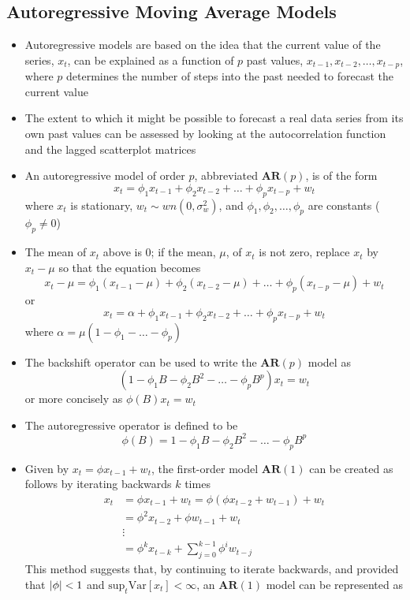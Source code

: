 \documentclass[12pt]{article}
\renewcommand{\var}[1]{\text{Var}\left[ #1 \right]}
\newcommand{\ar}[1]{$\mathbf{AR}(#1)$}
\begin{document}
\subsection{Autoregressive Moving Average Models}
\begin{itemize}
\item Autoregressive models are based on the idea that the current value of the series, $x_t$, can be explained as a function of $p$ past values, $x_{t-1}, x_{t-2},\dots,x_{t-p}$, where $p$ determines the number of steps into the past needed to forecast the current value
\item The extent to which it might be possible to forecast a real data series from its own past values can be assessed by looking at the autocorrelation function and the lagged scatterplot matrices 
\item An autoregressive model of order $p$, abbreviated \ar{p}, is of the form
$$ x_t = \phi_1x_{t-1} + \phi_2x_{t-2} + \dots + \phi_px_{t-p} + w_t $$ 
where $x_t$ is stationary, $w_t \sim wn(0, \sigma^2_w)$, and $\phi_1,\phi_2,\dots,\phi_p$ are constants ($\phi_p \neq 0$)
\item The mean of $x_t$ above is $0$; if the mean, $\mu$, of $x_t$ is not zero, replace $x_t$ by $x_t - \mu$ so that the equation becomes
$$ x_t - \mu = \phi_1(x_{t-1} - \mu) + \phi_2(x_{t-2} - \mu) + \dots + \phi_p(x_{t-p} - \mu) + w_t $$ or 
$$ x_t = \alpha + \phi_1x_{t-1} + \phi_2x_{t-2} + \dots + \phi_px_{t-p} + w_t $$ where $\alpha = \mu(1 - \phi_1 - \dots - \phi_p)$
\item The backshift operator can be used to write the \ar{p} model as $$ (1 - \phi_1B - \phi_2B^2 - \dots - \phi_pB^p)x_t = w_t $$ or more concisely as $\phi(B)x_t = w_t$
\item The autoregressive operator is defined to be $$ \phi(B) = 1 - \phi_1B - \phi_2B^2 - \dots - \phi_pB^p $$ 
\item Given by $x_t = \phi x_{t-1} + w_t$, the first-order model \ar{1} can be created as follows by iterating backwards $k$ times 
$$ \begin{aligned} x_t &= \phi x_{t-1} + w_t = \phi(\phi x_{t-2} + w_{t-1}) + w_t \\ &= \phi^2x_{t-2} + \phi w_{t-1} + w_t \\ &\vdots \\ &= \phi^k x_{t-k} + \sum_{j=0}^{k-1} \phi^iw_{t-j} \end{aligned} $$ 
This method suggests that, by continuing to iterate backwards, and provided that $\abs{\phi} < 1$ and $\text{sup}_t \var{x_t} < \infty$, an \ar{1} model can be represented as

\end{itemize}
\end{document}
